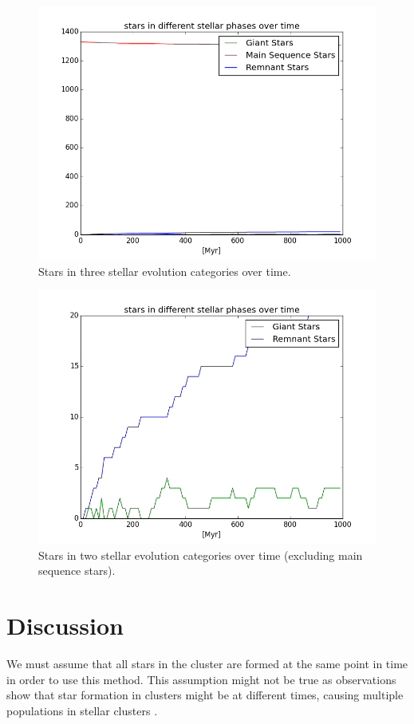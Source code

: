 \documentclass{aa}
\begin{document}
\begin{figure}
    \centering
    \includegraphics[width=\hsize]{img/stellar_phases_counts.png}
    \caption{Stars in three stellar evolution categories over time.}\label{fig:phases}
\end{figure}

\begin{figure}
    \centering
    \includegraphics[width=\hsize]{img/stellar_phases_counts_without_main_sequence.png}
    \caption{Stars in two stellar evolution categories over time (excluding main sequence stars).}\label{fig:phases_without_ms}
\end{figure}

\section{Discussion}\label{sec:discussion}
We must assume that all stars in the cluster are formed at the same point in time in order to use this method. This assumption might not be true as observations show that star formation in clusters might be at different times, causing multiple populations in stellar clusters \citep{2009IAUS..258..233P}.
\end{document}
